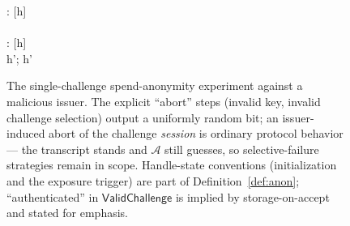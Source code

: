 \documentclass[11pt]{article}
\newcommand{\adv}{\mathcal{A}}
\begin{document}
\begin{figure}[H]
\begin{pcvstack}[boxed]
{ \pcind \pcif {} \ne {}: 
   [h]   \adv \\
 \pcif {} \\
 \pcind \pcif {} \ne {}:
   [h]  \\
 \pcind {} h';
   \; \pcreturn h' \\
 \pcreturn \bot \quad {}}
\pcvspace
{}
\end{pcvstack}
\caption{The single-challenge spend-anonymity experiment against a
malicious issuer. The explicit ``abort'' steps (invalid key, invalid
challenge selection) output a uniformly random bit; an issuer-induced
abort of the challenge \emph{session} is ordinary protocol behavior ---
the transcript stands and $\adv$ still guesses, so selective-failure
strategies remain in scope. Handle-state conventions (initialization and
the exposure trigger) are part of Definition~\ref{def:anon};
``authenticated'' in $\mathsf{ValidChallenge}$ is implied by
storage-on-accept and stated for emphasis.}
\label{fig:anon}
\end{figure}
\end{document}
